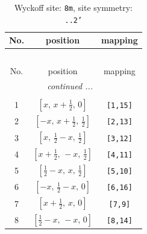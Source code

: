 \documentclass[fleqn,8pt]{jsarticle}
\begin{document}
\begin{longtable}{ccc}
\caption{Wyckoff site: {\tt 8m}, site symmetry: {\tt ..2'}}
 \\
 \hline \hline
No. & position & mapping \\ \hline \endfirsthead

\multicolumn{2}{l}{\tablename\ \thetable{}} \\
 \hline \hline
No. & position & mapping \\ \hline \endhead

 \hline \hline
\multicolumn{2}{r}{\footnotesize\it continued ...} \\ \endfoot

 \hline \hline
\multicolumn{2}{r}{} \\ \endlastfoot

1 & $\left[ x,\, x + \frac{1}{2},\, 0 \right]$ & {\tt [1,15]} \\ \hline
2 & $\left[ - x,\, x + \frac{1}{2},\, \frac{1}{2} \right]$ & {\tt [2,13]} \\ \hline
3 & $\left[ x,\, \frac{1}{2} - x,\, \frac{1}{2} \right]$ & {\tt [3,12]} \\ \hline
4 & $\left[ x + \frac{1}{2},\, - x,\, \frac{1}{2} \right]$ & {\tt [4,11]} \\ \hline
5 & $\left[ \frac{1}{2} - x,\, x,\, \frac{1}{2} \right]$ & {\tt [5,10]} \\ \hline
6 & $\left[ - x,\, \frac{1}{2} - x,\, 0 \right]$ & {\tt [6,16]} \\ \hline
7 & $\left[ x + \frac{1}{2},\, x,\, 0 \right]$ & {\tt [7,9]} \\ \hline
8 & $\left[ \frac{1}{2} - x,\, - x,\, 0 \right]$ & {\tt [8,14]} \\
\end{longtable}
\renewcommand{\arraystretch}{1.2}
\end{document}
